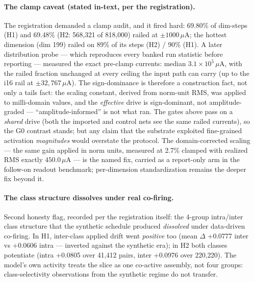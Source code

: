 \paragraph{The clamp caveat (stated in-text, per the registration).}
The registration demanded a clamp audit, and it fired hard:
69.80\% of dim-steps (H1) and 69.48\% (H2: 568{,}321 of 818{,}000)
railed at $\pm1000\,\mu\mathrm{A}$; the hottest dimension (dim 199)
railed on 89\% of its steps (H2) / 90\% (H1). A later distribution
probe --- which reproduces every banked run statistic before reporting
--- measured the exact pre-clamp currents: median
$3.1\times10^{5}\,\mu$A, with the railed fraction unchanged at every
ceiling the input path can carry (up to the i16 rail at
$\pm32{,}767\,\mu$A). The sign-dominance is therefore a construction
fact, not only a tails fact: the scaling constant, derived from
norm-unit RMS, was applied to milli-domain values, and the
\emph{effective} drive is sign-dominant, not amplitude-graded ---
``amplitude-informed'' is not what ran. The gates above pass on a \emph{shared} drive (both
the imported and control nets see the same railed currents), so the G0
contrast stands; but any claim that the substrate exploited
fine-grained activation \emph{magnitudes} would overstate the
protocol. The domain-corrected scaling --- the same gain applied in
norm units, measured at 2.7\% clamped with realized RMS exactly
$450.0\,\mu$A --- is the named fix, carried as a report-only arm in the
follow-on readout benchmark; per-dimension standardization remains the
deeper fix beyond it.

\paragraph{The class structure dissolves under real co-firing.}
Second honesty flag, recorded per the registration itself: the
4-group intra/inter class structure that the synthetic schedule
produced \emph{dissolved} under data-driven co-firing. In H1,
inter-class applied drift went \emph{positive} too (mean $\Delta$
+0.0777 inter vs +0.0606 intra --- inverted against the synthetic
era); in H2 both classes potentiate (intra +0.0805 over 41{,}412
pairs, inter +0.0976 over 220{,}220). The model's own activity treats
the slice as one co-active assembly, not four groups:
class-selectivity observations from the synthetic regime do not
transfer.

